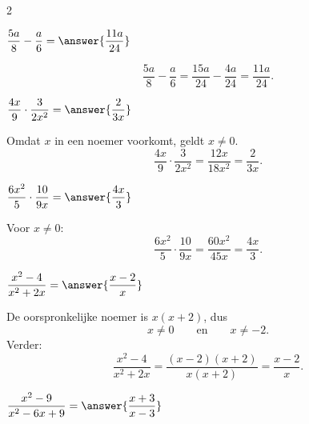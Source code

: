 \documentclass{ximera}
\begin{document}
\begin{oefening}[Breuken]{\oefB\ESS}
\begin{multicols}{2}
        
        \begin{question}
        $\dfrac{5a}{8}-\dfrac{a}{6}
        =\answer{\dfrac{11a}{24}}$
        
        \begin{oplossing}
        \[
        \dfrac{5a}{8}-\dfrac{a}{6}
        =\dfrac{15a}{24}-\dfrac{4a}{24}
        =\dfrac{11a}{24}.
        \]
        \end{oplossing}
        \end{question}
        
        
        \begin{question}
        $\dfrac{4x}{9}\cdot\dfrac{3}{2x^2}
        =\answer{\dfrac{2}{3x}}$
        
        \begin{oplossing}
        Omdat $x$ in een noemer voorkomt, geldt $x\neq0$.
        \[
        \dfrac{4x}{9}\cdot\dfrac{3}{2x^2}
        =\dfrac{12x}{18x^2}
        =\dfrac{2}{3x}.
        \]
        \end{oplossing}
        \end{question}
        
        
        \begin{question}
        $\dfrac{6x^2}{5}\cdot\dfrac{10}{9x}
        =\answer{\dfrac{4x}{3}}$
        
        \begin{oplossing}
        Voor $x\neq0$:
        \[
        \dfrac{6x^2}{5}\cdot\dfrac{10}{9x}
        =\dfrac{60x^2}{45x}
        =\dfrac{4x}{3}.
        \]
        \end{oplossing}
        \end{question}
        
        
        \begin{question}
        $\dfrac{x^2-4}{x^2+2x}
        =\answer{\dfrac{x-2}{x}}$
        
        \begin{oplossing}
        De oorspronkelijke noemer is $x(x+2)$, dus
        \[
        x\neq0
        \qquad\text{en}\qquad
        x\neq-2.
        \]
        Verder:
        \[
        \dfrac{x^2-4}{x^2+2x}
        =\dfrac{(x-2)(x+2)}{x(x+2)}
        =\dfrac{x-2}{x}.
        \]
        \end{oplossing}
        \end{question}
        
        
        \begin{question}
        $\dfrac{x^2-9}{x^2-6x+9}
        =\answer{\dfrac{x+3}{x-3}}$
        

\end{question}
\end{multicols}
\end{oefening}
\end{document}

